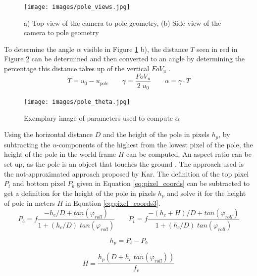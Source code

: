 \begin{figure}[h!]
   \centering
   \texttt{[image: images/pole\_views.jpg]}
   \caption{a) Top view of the camera to pole geometry, (b) Side view of the camera to pole geometry}
   \label{pics:pole_depth}
\end{figure}

To determine the angle $\alpha$ visible in Figure \ref{pics:pole_depth} b), the distance $T$ seen in red in Figure \ref{pics:theta} can be determined and then converted to an angle by determining the percentage this distance takes up of the vertical $FoV_u$ \citep{namazi2022geolocation}.
\begin{equation}
T = u_0 - u_{pole}  \; \; \; \; \; \; \; \gamma = \frac{FoV_u}{2 \; u_0} \; \; \; \; \; \; \; \alpha = \gamma \cdot T
\label{eq:theta}
\end{equation}

\begin{figure}[h!]
   \centering
   \texttt{[image: images/pole\_theta.jpg]}
   \caption{Exemplary image of parameters used to compute $\alpha$}
   \label{pics:theta}
\end{figure}

Using the horizontal distance $D$ and the height of the pole in pixels $h_{p}$, by subtracting the $u$-components of the highest from the lowest pixel of the pole, the height of the pole in the world frame $H$ can be computed. An aspect ratio can be set up, as the pole is an object that touches the ground \citep{euclid1943optics}. The approach used is the not-approximated approach proposed by Kar\citep{kar2015amodal}. The definition of the top pixel $P_{t}$ and bottom pixel $P_{b}$ given in Equation \ref{eq:pixel_coords} can be subtracted to get a definition for the height of the pole in pixels $h_{p}$ and solve it for the height of pole in meters $H$ in Equation \ref{eq:pixel_coords3}. 
\begin{equation}
P_{b} = f \frac{-h_c/D + tan(\varphi_{roll})}{1+(h_c/D) \; tan(\varphi_{roll})} \; \; \; \; \; \; \;
P_{t} = f \frac{-(h_c + H)/D + tan(\varphi_{roll})}{1+(h_c/D) \;tan(\varphi_{roll})}
\label{eq:pixel_coords}
\end{equation}

\begin{equation}
h_{p} = P_{t} - P_{b} 
\label{eq:pixel_coords2}
\end{equation}

\begin{equation}
H = \frac{h_{p} ( D + h_c \; tan(\varphi_{roll})) }{f_v}
\label{eq:pixel_coords3}
\end{equation}
\\



